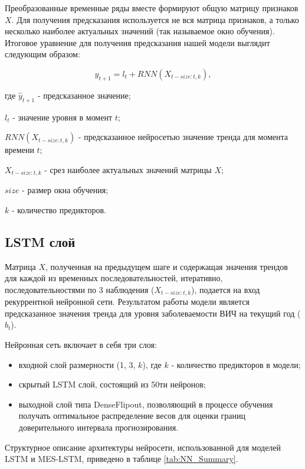 Преобразованные временные ряды вместе формируют общую матрицу признаков $X$. Для получения предсказания используется не вся матрица признаков, а только несколько наиболее актуальных значений (так называемое окно обучения). Итоговое уравнение для получения предсказания нашей модели выглядит следующим образом:

\begin{equation}
	\label{eq:forecasting_MESRNN}
	\hat{y}_{t+1} = l_t + RNN(X_{t-size:t, k}),
\end{equation}


где $\hat{y}_{t+1}$ - предсказанное значение;

$l_t$ - значение уровня в момент $t$;

$RNN(X_{t-size:t, k})$ - предсказанное нейросетью значение тренда для момента времени $t$;

$X_{t-size:t, k}$ - срез наиболее актуальных значений матрицы $X$;

$size$ - размер окна обучения;

$k$ - количество предикторов.


\subsection{LSTM слой}

Матрица $X$, полученная на предыдущем шаге и содержащая значения трендов для каждой из временных последовательностей, итеративно, последовательностями по 3 наблюдения ($X_{t-size:t, k}$), подается на вход рекуррентной нейронной сети. Результатом работы модели является предсказанное значения тренда для уровня заболеваемости ВИЧ на текущий год ($\hat{b}_{t}$). 

Нейронная сеть включает в себя три слоя:
\begin{itemize}
	\item входной слой размерности (1, 3, $k$), где $k$ - количество предикторов в модели;
	\item скрытый LSTM слой, состоящий из 50ти нейронов;
	\item выходной слой типа DenseFlipout, позволяющий в процессе обучения получать оптимальное распределение весов для оценки границ доверительного интервала прогнозирования.
\end{itemize}

Структурное описание архитектуры нейросети, использованной для моделей LSTM и MES-LSTM, приведено в таблице \ref{tab:NN_Summary}. 

